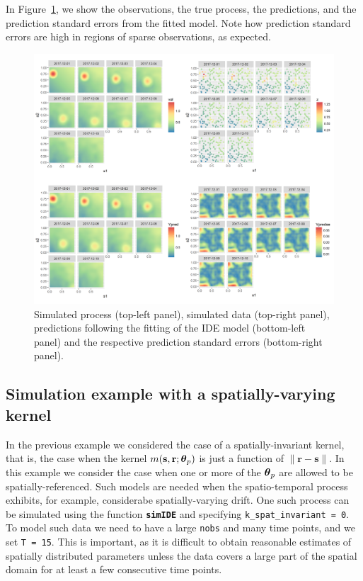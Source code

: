 \documentclass{article}\usepackage[]{graphicx}\usepackage[]{color}
\newcommand{\hlnum}[1]{\textcolor[rgb]{0.686,0.059,0.569}{#1}}%
\newcommand{\hlkwc}[1]{\textcolor[rgb]{0.333,0.667,0.333}{#1}}%
\newcommand{\hlkwd}[1]{\textcolor[rgb]{0.737,0.353,0.396}{\textbf{#1}}}%
\def\br{\mathbf{r}}
\def\bs{\mathbf{s}}
\newcommand{\bftheta}{\mbox{\boldmath $\theta$}}
\newcommand{\fn}[1]{\texttt{\hlkwd{#1}}}
\newcommand{\num}[1]{\texttt{\hlnum{#1}}}
\newcommand{\args}[1]{\texttt{\hlkwc{#1}}}
\newcommand{\cc}[1]{\texttt{#1}}
\begin{document}
\noindent In Figure~\ref{fig:IDEsimresults}, we show the observations, the true process, the predictions, and the prediction standard errors from the fitted model. Note how prediction standard errors are high in regions of sparse observations, as expected.



\begin{figure}[t!]
\begin{center}
\includegraphics[width=\linewidth,angle=0]{IDEsimresults.png}
\end{center}
\caption{Simulated process (top-left panel), simulated data (top-right panel), predictions following the fitting of the IDE model (bottom-left panel) and the respective prediction standard errors (bottom-right panel).}
\label{fig:IDEsimresults}
\end{figure}



\subsection*{Simulation example with a spatially-varying kernel}

In the previous example we considered the case of a spatially-invariant kernel, that is, the case when the kernel $m(\bs,\br;\bftheta_p)$ is just a function of $\|\br - \bs\|$. In this example we consider the case when one or more of the $\bftheta_p$ are allowed to be spatially-referenced. Such models are needed when the spatio-temporal process exhibits, for example, considerabe spatially-varying drift. One such process can be simulated using the function \fn{simIDE} and specifying \args{k\_spat\_invariant}\cc{ = }\num{0}. To model such data we need to have a large \args{nobs} and many time points, and we set \args{T}\cc{ = }\num{15}. This is important, as it is difficult to obtain reasonable estimates of spatially distributed parameters unless the data covers a large part of the spatial domain for at least a few consecutive time points.
\end{document}
